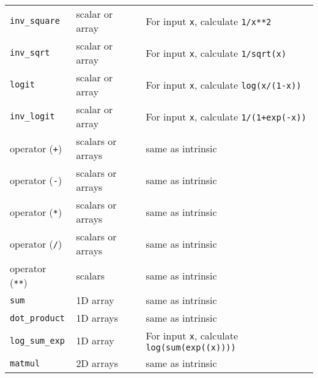 \documentclass[12pt, reqno, oneside]{amsbook}
\begin{document}
\begin{center}
\begin{tabular}{lll}
\texttt{inv\_square} & scalar or array & For input \texttt{x}, calculate \texttt{1/x**2}\\
\texttt{inv\_sqrt} & scalar or array & For input \texttt{x}, calculate \texttt{1/sqrt(x)}\\
\texttt{logit} & scalar or array & For input \texttt{x}, calculate \texttt{log(x/(1-x))}\\
\texttt{inv\_logit} & scalar or array & For input \texttt{x}, calculate \texttt{1/(1+exp(-x))}\\
operator (\texttt{+}) & scalars or arrays & same as intrinsic\\
operator (\texttt{-}) & scalars or arrays & same as intrinsic\\
operator (\texttt{*}) & scalars or arrays & same as intrinsic\\
operator (\texttt{/}) & scalars or arrays & same as intrinsic\\
operator (\texttt{**}) & scalars & same as intrinsic\\
\texttt{sum} & 1D array & same as intrinsic\\
\texttt{dot\_product} & 1D arrays & same as intrinsic\\
\texttt{log\_sum\_exp} & 1D array & For input \texttt{x}, calculate \texttt{log(sum(exp((x))))}\\
\texttt{matmul} & 2D arrays & same as intrinsic\\
\end{tabular}
\end{center}



\end{document}
